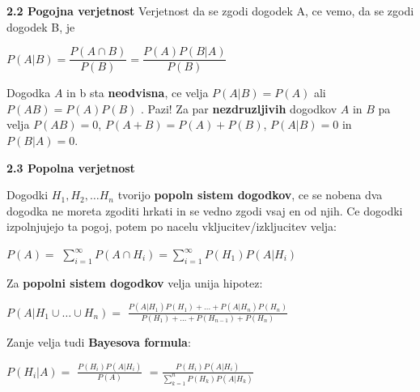 \documentclass{article}
\begin{document}
\begin{multicols}{3}
\textbf{2.2 Pogojna verjetnost}
Verjetnost da se zgodi dogodek A, ce vemo, da se zgodi dogodek B, je
\begin{center}
    \begin{math}
        P(A | B) = \dfrac{P(A \cap B)}{P(B)} = \dfrac{P(A)P(B|A)}{P(B)}
    \end{math}
\end{center}
Dogodka $A$ in b sta \textbf{neodvisna}, ce velja $P(A | B) = P(A)$ ali
$P(A B) = P(A)P(B)$ .
Pazi! Za par \textbf{nezdruzljivih} dogodkov $A$ in $B$
pa velja $P(AB) = 0$,  $P(A + B) = P(A) + P(B)$, $P(A|B) = 0$ in $P(B|A) = 0$.

\textbf{2.3 Popolna verjetnost}

Dogodki $H_{1}, H_{2}, \dots H_{n}$ tvorijo \textbf{popoln sistem dogodkov},
ce se nobena dva dogodka ne moreta zgoditi hrkati in se vedno
zgodi vsaj en od njih. Ce dogodki izpolnjujejo ta pogoj, potem po
nacelu vkljucitev/izkljucitev velja:
\begin{center}
    \begin{math}
        P(A) =
    \end{math}
    \smallskip
    \begin{math}
        \sum_{i=1}^{\infty} P(A \cap H_{i}) =
        \sum_{i=1}^{\infty} P(H_{1}) P(A | H_{i})
    \end{math}
\end{center}
Za \textbf{popolni sistem dogodkov} velja unija hipotez:
\begin{center}
    \begin{math}
        P(A|H_{1} \cup \dots \cup H_{n}) = 
    \end{math}
    \bigskip
    \begin{math}
        \frac{
            P(A | H_{1}) P(H_{1}) + \dots +
            P(A | H_{n}) P(H_{n})
        }
        {
            P(H_{1}) + \dots + P(H_{n - 1}) + P(H_{n})
        }
    \end{math}    
\end{center}
Zanje velja tudi \textbf{Bayesova formula}:
\begin{center}
    \begin{math}
        P(H_{i} | A) = 
    \end{math}
    \begin{math}
        \frac{
            P(H_{i}) P(A | H_{i})
        }
        {
            P(A)
        }
    \end{math}
    \begin{math}
        = \frac{
            P(H_{i}) P(A | H_{i})
        }
        {
            \sum_{k=1}^{n} P(H_{k}) P(A | H_{k})
        }
    \end{math}        
\end{center}


\end{multicols}
\end{document}
